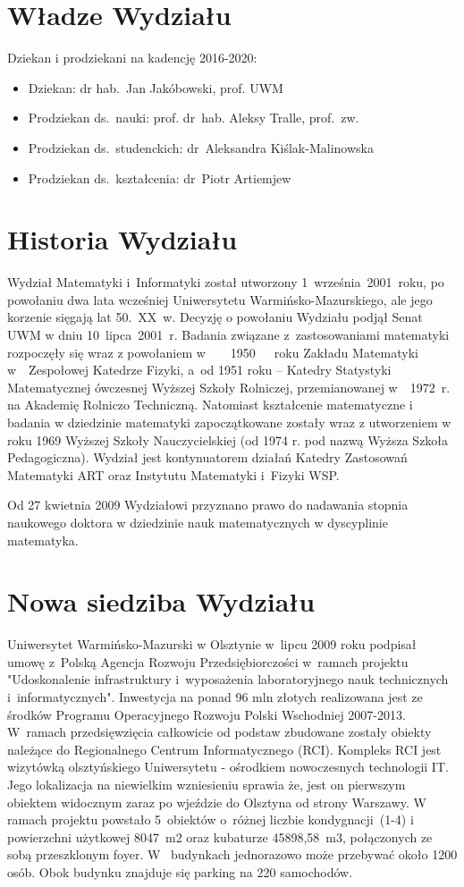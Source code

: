 \documentclass[a4paper,11pt]{article}
\begin{document}
\begin{itemize}
\section{Władze Wydziału} 
Dziekan i prodziekani na kadencję 2016-2020:

\begin{itemize}
\item Dziekan: dr hab.~Jan Jakóbowski, prof. UWM
\item Prodziekan ds.~nauki: prof. dr~hab. Aleksy Tralle, prof.~zw.
\item Prodziekan ds.~studenckich: dr~Aleksandra Kiślak-Malinowska
\item Prodziekan ds.~kształcenia: dr~Piotr Artiemjew
\end{itemize}
\section{Historia Wydziału} 
Wydział Matematyki i~Informatyki został utworzony 1~września~2001~roku, po powołaniu dwa lata wcześniej
Uniwersytetu Warmińsko-Mazurskiego, ale jego korzenie sięgają lat 50.~XX~w. Decyzję o powołaniu Wydziału
podjął Senat UWM w dniu 10~lipca~2001~r. Badania związane z~zastosowaniami matematyki rozpoczęły się
wraz z powołaniem w~~~~1950~~~roku Zakładu Matematyki w~~Zespołowej Katedrze Fizyki, a~od 1951 roku –
Katedry Statystyki Matematycznej ówczesnej Wyższej Szkoły Rolniczej, przemianowanej w~~1972~r. na
Akademię Rolniczo Techniczną. Natomiast kształcenie matematyczne i badania w dziedzinie matematyki
zapoczątkowane zostały wraz z utworzeniem w roku 1969 Wyższej Szkoły Nauczycielskiej (od 1974 r. pod
nazwą Wyższa Szkoła Pedagogiczna). Wydział jest kontynuatorem działań Katedry Zastosowań Matematyki
ART oraz Instytutu Matematyki i~Fizyki WSP.

Od 27 kwietnia 2009 Wydziałowi przyznano prawo do nadawania stopnia naukowego doktora w dziedzinie
nauk matematycznych w dyscyplinie matematyka.

\section{Nowa siedziba Wydziału} 
Uniwersytet Warmińsko-Mazurski w Olsztynie w~lipcu 2009 roku podpisał umowę z~Polską Agencja Rozwoju
Przedsiębiorczości w~ramach projektu "Udoskonalenie infrastruktury i~wyposażenia laboratoryjnego nauk
technicznych i~informatycznych". Inwestycja na ponad 96 mln złotych realizowana jest ze środków Programu
Operacyjnego Rozwoju Polski Wschodniej 2007-2013. W~ramach przedsięwzięcia całkowicie od podstaw
zbudowane zostały obiekty należące do Regionalnego Centrum Informatycznego (RCI).
Kompleks RCI jest wizytówką olsztyńskiego Uniwersytetu - ośrodkiem nowoczesnych technologii IT. Jego
lokalizacja na niewielkim wzniesieniu sprawia że, jest on pierwszym obiektem widocznym zaraz po wjeździe
do Olsztyna od strony Warszawy. W ramach projektu powstało 5~obiektów o~różnej liczbie kondygnacji~(1-4) i~
powierzchni użytkowej 8047~m2 oraz kubaturze 45898,58~m3, połączonych ze sobą przeszklonym foyer. W~
budynkach jednorazowo może przebywać około 1200 osób. Obok budynku znajduje się parking na 220
samochodów.


\end{itemize}
\end{document}
